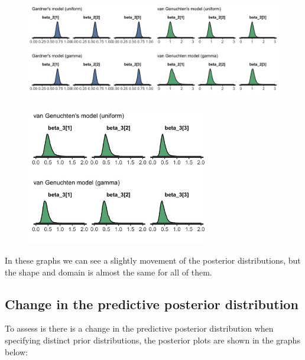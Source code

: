 \documentclass{article}
\begin{document}
\begin{figure}[ht!]
\centering
\includegraphics[width=16cm]{sens_3.png}
\end{figure}

\begin{figure}[ht!]
\centering
\includegraphics[width=8cm]{sens_4.png}
\end{figure}

In these graphs we can see a slightly movement of the posterior distributions, but the shape and domain is almost the same for all of them. 
\newpage
\subsection*{Change in the predictive posterior distribution}
To assess is there is a change in the predictive posterior distribution when specifying distinct prior distributions, the posterior plots are shown in the graphs below:
\end{document}

